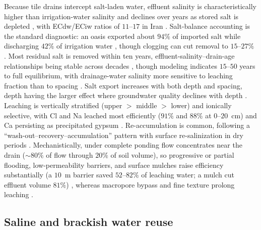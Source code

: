 Because tile drains intercept salt-laden water, effluent salinity is
characteristically higher than irrigation-water salinity and declines over years
as stored salt is depleted \parencite{Li2022,Karegoudar2022}, with ECdw/ECiw
ratios of $11$--$17$ in Iran \parencite{Akram2013}. Salt-balance accounting is
the standard diagnostic: an oasis exported about $94\%$ of imported salt while
discharging $42\%$ of irrigation water \parencite{Askri2022}, though clogging can
cut removal to $15$--$27\%$ \parencite{BenAissa2013,HajAmor2019}. Most residual
salt is removed within ten years, effluent-salinity--drain-age relationships
being stable across decades \parencite{JOHNSTON1993}, though modeling indicates
$15$--$50$ years to full equilibrium, with drainage-water salinity more sensitive
to leaching fraction than to spacing \parencite{Kelleners2000}. Salt export
increases with both depth and spacing, depth having the larger effect where
groundwater quality declines with depth \parencite{GRISMER1993,KAMRA1991,KAMRA1994}.
Leaching is vertically stratified (upper $>$ middle $>$ lower) and ionically
selective, with Cl and Na leached most efficiently ($91\%$ and $88\%$ at
$0$--$20$~cm) and Ca persisting as precipitated gypsum
\parencite{Chen2022,Qian2025,Yu2016}. Re-accumulation is common, following a
``wash-out--recovery--accumulation'' pattern with surface re-salinization in dry
periods \parencite{Zhu2025b,Dou2022,Shi2021b}. Mechanistically, under complete
ponding flow concentrates near the drain ($\sim80\%$ of flow through $20\%$ of
soil volume), so progressive or partial flooding, low-permeability barriers, and
surface mulches raise efficiency substantially (a $10$~m barrier saved
$52$--$82\%$ of leaching water; a mulch cut effluent volume $81\%$)
\parencite{RAO1991,Youngs2000,Yu2018,Zhang2022}, whereas macropore bypass and
fine texture prolong leaching \parencite{Xin2016,MANN1982}.

\subsection{Saline and brackish water reuse}

